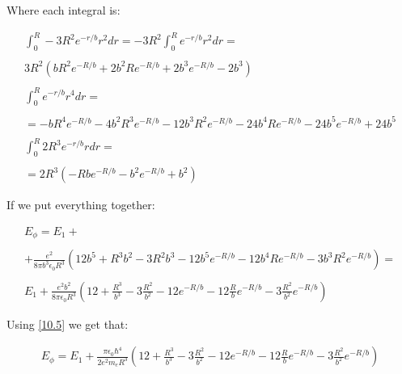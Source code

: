Where each integral is:

\begin{equation}
  \begin{array}{c}
    \int_{0}^{R} -3R^2 e^{-r/b}r^2 dr = -3R^2 \int_{0}^{R} e^{-r/b} r^2 dr =
    \\

    \\
    3R^2 (bR^2 e^{-R/b} + 2b^2 R e^{-R/b} + 2b^3 e^{-R/b} - 2b^3)
    \\

    \\
    \int_{0}^{R} e^{-r/b} r^4 dr =
    \\

    \\
    = -b R^4 e^{-R/b} - 4b^2 R^3 e^{-R/b} - 12b^3 R^2 e^{-R/b} - 24b^4 R e^{-R/b} - 24b^5 e^{-R/b} + 24b^5
    \\

    \\
    \int_{0}^{R} 2R^3 e^{-r/b} r dr =
    \\

    \\
    = 2R^3 (-R b e^{-R/b} - b^2 e^{-R/b} + b^2)
  \end{array}
\end{equation}

If we put everything together:

\begin{equation}
  \begin{array}{c}
    E_{\phi} = E_1 +
    \\

    \\
    + \frac{e^2}{8\pi b^3 \epsilon_0 R^3} \left(12b^5+R^3b^2-3R^2b^3-12b^5e^{-R/b}-12b^4Re^{-R/b}-3b^3R^2e^{-R/b}\right) =
    \\

    \\
    E_1 + \frac{e^2 b^2}{8 \pi\epsilon_0 R^3} \left(12 + \frac{R^3}{b^3} - 3\frac{R^2}{b^2} - 12 e^{-R/b} - 12 \frac{R}{b} e^{-R/b} - 3\frac{R^2}{b^2} e^{-R/b}\right)
  \end{array}
\end{equation}

Using \ref{10.5} we get that:

\begin{equation}
  \begin{array}{c}
  E_{\phi} = E_1 + \frac{\pi \epsilon_0 \hbar^4}{2 e^2 m_e R^3} \left(12 + \frac{R^3}{b^3} - 3\frac{R^2}{b^2} - 12 e^{-R/b} - 12 \frac{R}{b} e^{-R/b} - 3\frac{R^2}{b^2} e^{-R/b}\right)
  \end{array}
\end{equation}

